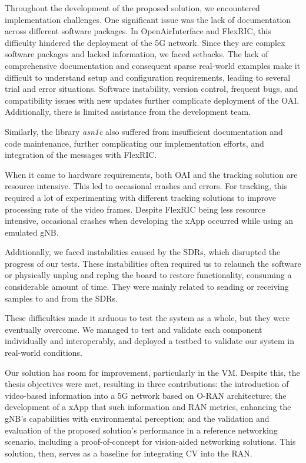 Throughout the development of the proposed solution, we encountered implementation challenges.
One significant issue was the lack of documentation across different software packages.
In OpenAirInterface and FlexRIC, this difficulty hindered the deployment of the 5G network.
Since they are complex software packages and lacked information, we faced setbacks.
The lack of comprehensive documentation and consequent sparse real-world examples make it difficult to understand setup and configuration requirements, leading to several trial and error situations.
Software instability, version control, frequent bugs, and compatibility issues with new updates further complicate deployment of the OAI\@.
Additionally, there is limited assistance from the development team.

Similarly, the library \emph{asn1c} also suffered from insufficient documentation and code maintenance, further complicating our implementation efforts, and integration of the messages with FlexRIC\@.

When it came to hardware requirements, both OAI and the tracking solution are resource intensive.
This led to occasional crashes and errors.
For tracking, this required a lot of experimenting with different tracking solutions to improve processing rate of the video frames.
Despite FlexRIC being less resource intensive, occasional crashes when developing the xApp occurred while using an emulated gNB\@.

Additionally, we faced instabilities caused by the SDRs, which disrupted the progress of our tests.
These instabilities often required us to relaunch the software or physically unplug and replug the board to restore functionality, consuming a considerable amount of time.
They were mainly related to sending or receiving samples to and from the SDRs.

These difficulties made it arduous to test the system as a whole, but they were eventually overcome.
We managed to test and validate each component individually and interoperably, and deployed a testbed to validate our system in real-world conditions.

Our solution has room for improvement, particularly in the VM\@.
Despite this, the thesis objectives were met, resulting in three contributions: the introduction of video-based information into a 5G network based on O-RAN architecture; the development of a xApp that such information and RAN metrics, enhancing the gNB's capabilities with environmental perception; and the validation and evaluation of the proposed solution's performance in a reference networking scenario, including a proof-of-concept for vision-aided networking solutions.
This solution, then, serves as a baseline for integrating CV into the RAN.

